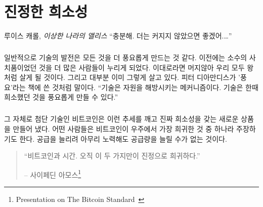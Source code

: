 
\chapter{진정한 희소성}
\label{les:2}

\begin{chapquote}{루이스 캐롤, \textit{이상한 나라의 앨리스}}
	\enquote{충분해. 더는 커지지 않았으면 좋겠어.\ldots}
\end{chapquote}


\paragraph{}
일반적으로 기술의 발전은 모든 것을 더 풍요롭게 만드는 것 같다. 이전에는 소수의 사치품이었던 것을 더 많은 사람들이 누리게 되었다. 
이대로라면 머지않아 우리 모두 왕처럼 살게 될 것이다. 그리고 대부분 이미 그렇게 살고 있다.
피터 디아만디스가 '풍요'라는 책에 쓴 것처럼 말이다.\cite{abundance} \enquote{기술은 자원을 해방시키는 메커니즘이다. 기술은 한때 희소했던 것을 풍요롭게 만들 수 있다.}

\paragraph{}
그 자체로 첨단 기술인 비트코인은 이런 추세를 깨고 진짜 희소성을 갖는 새로운 상품을 만들어 냈다. 
어떤 사람들은 비트코인이 우주에서 가장 희귀한 것 중 하나라 주장하기도 한다.
공급을 늘리려 아무리 노력해도 공급량을 늘릴 수가 없는 것이다. 

\begin{quotation}
	\begin{samepage} \enquote{비트코인과 시간. 오직 이 두 가지만이 진정으로 희귀하다.}
		\begin{flushright} -- 사이페딘 아모스\footnote{Presentation on The Bitcoin Standard~\cite{bitcoinstandard-pres}}
		\end{flushright}
	\end{samepage}
\end{quotation}

